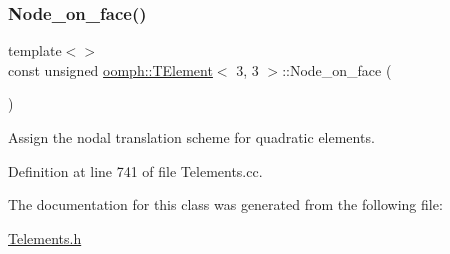 \subsubsection{\texorpdfstring{Node\+\_\+on\+\_\+face()}{Node\_on\_face()}\hspace{0.1cm}{\footnotesize\ttfamily [5/5]}}
{\footnotesize\ttfamily template$<$$>$ \\
const unsigned \hyperlink{classoomph_1_1TElement}{oomph\+::\+T\+Element}$<$ 3, 3 $>$\+::Node\+\_\+on\+\_\+face (\begin{DoxyParamCaption}{ }\end{DoxyParamCaption})}



Assign the nodal translation scheme for quadratic elements. 



Definition at line 741 of file Telements.\+cc.



The documentation for this class was generated from the following file\+:\begin{DoxyCompactItemize}
\item 
\hyperlink{Telements_8h}{Telements.\+h}\end{DoxyCompactItemize}
